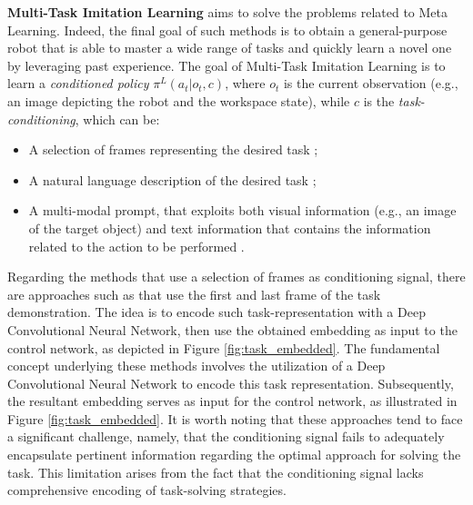\textbf{Multi-Task Imitation Learning} aims to solve the problems related to Meta Learning. Indeed, the final goal of such methods is to obtain a general-purpose robot that is able to master a wide range of tasks and quickly learn a novel one by leveraging past experience.
The goal of Multi-Task Imitation Learning is to learn a \textit{conditioned policy} $\pi^{L}(a_{t}|o_{t}, c)$, where $o_{t}$ is the current observation (e.g., an image depicting the robot and the workspace state), while $c$ is the \textit{task-conditioning}, which can be:
\begin{itemize}
    \item A selection of frames representing the desired task \cite{james2018task_embedded,bhutani2022attentive_one_shot,dasari2021transformers_one_shot,mandi2022towards_more_generalizable_one_shot};
    \item A natural language description of the desired task \cite{stepputtis2020language,jang2022bc_z,mees2022calvin,doasIcan2022,mees2022hulc,brohan2022rt,shridhar2023perceiver};
    \item A multi-modal prompt, that exploits both visual information (e.g., an image of the target object) and text information that contains the information related to the action to be performed \cite{jiang2023vima}.
\end{itemize}
Regarding the methods that use a selection of frames as conditioning signal, there are approaches such as \cite{james2018task_embedded,bhutani2022attentive_one_shot} that use the first and last frame of the task demonstration. The idea is to encode such task-representation with a Deep Convolutional Neural Network, then use the obtained embedding as input to the control network, as depicted in Figure \ref{fig:task_embedded}. The fundamental concept underlying these methods involves the utilization of a Deep Convolutional Neural Network to encode this task representation. Subsequently, the resultant embedding serves as input for the control network, as illustrated in Figure \ref{fig:task_embedded}. It is worth noting that these approaches tend to face a significant challenge, namely, that the conditioning signal fails to adequately encapsulate pertinent information regarding the optimal approach for solving the task. This limitation arises from the fact that the conditioning signal lacks comprehensive encoding of task-solving strategies.

